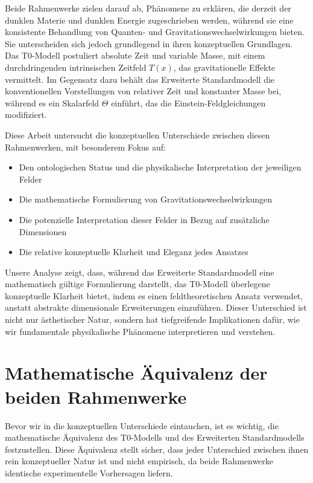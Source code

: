 \documentclass[12pt,a4paper]{article}
\newcommand{\Tfield}{T(x)}
\begin{document}
	Beide Rahmenwerke zielen darauf ab, Phänomene zu erklären, die derzeit der dunklen Materie und dunklen Energie zugeschrieben werden, während sie eine konsistente Behandlung von Quanten- und Gravitationswechselwirkungen bieten. Sie unterscheiden sich jedoch grundlegend in ihren konzeptuellen Grundlagen. Das T0-Modell postuliert absolute Zeit und variable Masse, mit einem durchdringenden intrinsischen Zeitfeld \(\Tfield\), das gravitationelle Effekte vermittelt. Im Gegensatz dazu behält das Erweiterte Standardmodell die konventionellen Vorstellungen von relativer Zeit und konstanter Masse bei, während es ein Skalarfeld \(\Theta\) einführt, das die Einstein-Feldgleichungen modifiziert.
	
	Diese Arbeit untersucht die konzeptuellen Unterschiede zwischen diesen Rahmenwerken, mit besonderem Fokus auf:
	
	\begin{itemize}
		\item Den ontologischen Status und die physikalische Interpretation der jeweiligen Felder
		\item Die mathematische Formulierung von Gravitationswechselwirkungen
		\item Die potenzielle Interpretation dieser Felder in Bezug auf zusätzliche Dimensionen
		\item Die relative konzeptuelle Klarheit und Eleganz jedes Ansatzes
	\end{itemize}
	
	Unsere Analyse zeigt, dass, während das Erweiterte Standardmodell eine mathematisch gültige Formulierung darstellt, das T0-Modell überlegene konzeptuelle Klarheit bietet, indem es einen feldtheoretischen Ansatz verwendet, anstatt abstrakte dimensionale Erweiterungen einzuführen. Dieser Unterschied ist nicht nur ästhetischer Natur, sondern hat tiefgreifende Implikationen dafür, wie wir fundamentale physikalische Phänomene interpretieren und verstehen.
	
	\section{Mathematische Äquivalenz der beiden Rahmenwerke}
	\label{sec:mathematical_equivalence}
	
	Bevor wir in die konzeptuellen Unterschiede eintauchen, ist es wichtig, die mathematische Äquivalenz des T0-Modells und des Erweiterten Standardmodells festzustellen. Diese Äquivalenz stellt sicher, dass jeder Unterschied zwischen ihnen rein konzeptueller Natur ist und nicht empirisch, da beide Rahmenwerke identische experimentelle Vorhersagen liefern.
	
\end{document}
